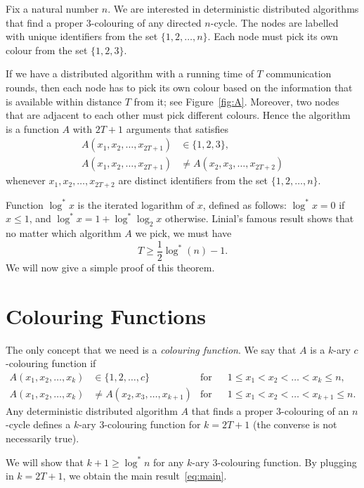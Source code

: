 \documentclass[11pt,a4paper]{article}
\begin{document}
Fix a natural number $n$. We are interested in deterministic distributed algorithms that find a proper $3$-colouring of any directed $n$-cycle. The nodes are labelled with unique identifiers from the set $\{1,2,\dotsc,n\}$. Each node must pick its own colour from the set $\{1,2,3\}$.

If we have a distributed algorithm with a running time of $T$ communication rounds, then each node has to pick its own colour based on the information that is available within distance $T$ from it; see Figure~\ref{fig:A}. Moreover, two nodes that are adjacent to each other must pick different colours. Hence the algorithm is a function $A$ with $2T+1$ arguments that satisfies
\begin{align*}
    A(x_1, x_2, \dotsc, x_{2T+1}) &\in \{1,2,3\}, \\
    A(x_1, x_2, \dotsc, x_{2T+1}) &\ne A(x_2, x_3, \dotsc, x_{2T+2})
\end{align*}
whenever $x_1, x_2, \dotsc, x_{2T+2}$ are distinct identifiers from the set $\{1,2,\dotsc,n\}$.

Function $\log^* x$ is the iterated logarithm of $x$, defined as follows:
$\log^* x = 0$ if $x \le 1$, and
$\log^* x = 1 + \log^* \log_2 x$ otherwise.
Linial's famous result shows that no matter which algorithm $A$ we pick, we must have
\begin{equation}
    T \ge \frac{1}{2}\log^*(n) - 1. \label{eq:main}
\end{equation}
We will now give a simple proof of this theorem.


\section{Colouring Functions}

The only concept that we need is a \emph{colouring function}. We say that $A$ is a $k$-ary $c$-colouring function if
\begin{align}
    A(x_1, x_2, \dotsc, x_k) &\in \{1,2,\dotsc,c\} & \text{for all } & 1 \le x_1 < x_2 < \dotso < x_k \le n, \label{eq:col1} \\
    A(x_1, x_2, \dotsc, x_k) &\ne A(x_2, x_3, \dotsc, x_{k+1}) & \text{for all } & 1 \le x_1 < x_2 < \dotso < x_{k+1} \le n. \label{eq:col2}
\end{align}
Any deterministic distributed algorithm $A$ that finds a proper $3$-colouring of an $n$-cycle defines a $k$-ary $3$-colouring function for $k = 2T+1$ (the converse is not necessarily true).

We will show that $k + 1 \ge \log^* n$ for any $k$-ary $3$-colouring function. By plugging in $k = 2T+1$, we obtain the main result~\eqref{eq:main}.
\end{document}
